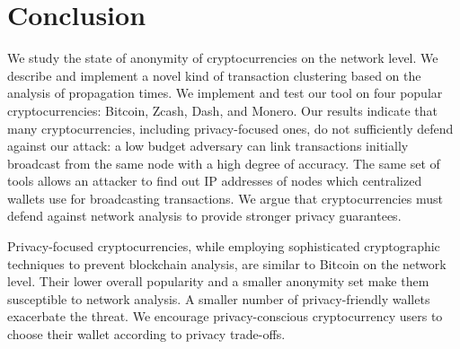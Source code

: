 \section{Conclusion} \label{sec:Ch03Conclusion}

We study the state of anonymity of cryptocurrencies on the network level.
We describe and implement a novel kind of transaction clustering based on the analysis of propagation times.
We implement and test our tool on four popular cryptocurrencies: Bitcoin, Zcash, Dash, and Monero.
Our results indicate that many cryptocurrencies, including privacy-focused ones, do not sufficiently defend against our attack: a low budget adversary can link transactions initially broadcast from the same node with a high degree of accuracy.
The same set of tools allows an attacker to find out IP addresses of nodes which centralized wallets use for broadcasting transactions.
We argue that cryptocurrencies must defend against network analysis to provide stronger privacy guarantees.

Privacy-focused cryptocurrencies, while employing sophisticated cryptographic techniques to prevent blockchain analysis, are similar to Bitcoin on the network level.
Their lower overall popularity and a smaller anonymity set make them susceptible to network analysis.
A smaller number of privacy-friendly wallets exacerbate the threat.
We encourage privacy-conscious cryptocurrency users to choose their wallet according to privacy trade-offs.





